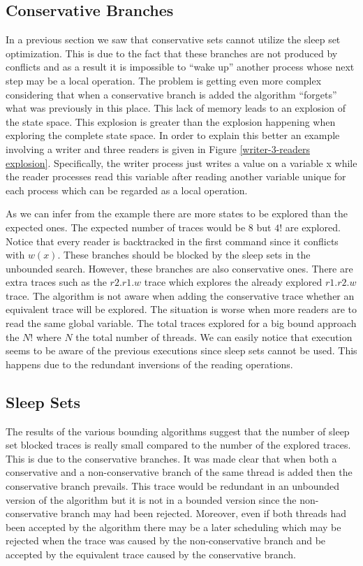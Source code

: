 \subsection{Conservative Branches}
In a previous section we saw that conservative sets cannot utilize the sleep set optimization. This is due
to the fact that these branches are not produced by conflicts and as a result it is impossible to ``wake up'' another
process whose next step may be a local operation. The problem is getting even more complex considering that when a
conservative branch is added the algorithm ``forgets'' what was previously in this place. This lack of memory leads to an
explosion of the state space. This explosion is greater than the explosion happening when exploring the complete state
space. In order to explain this better an example involving a writer and three readers is given in Figure \ref{writer-3-readers
explosion}. Specifically, the writer process just writes a value on a variable x while the reader processes read this variable
after reading another variable unique for each process which can be regarded as a local operation.


As we can infer from the example there are more states to be explored than the expected ones. The expected number of
traces would be $8$ but $4!$ are explored. Notice that every reader is backtracked in the first command since it
conflicts with $w(x)$. These branches should be blocked by the sleep sets in the unbounded search. However, these
branches are also conservative ones. There are extra traces such as the $r2.r1.w$ trace which explores the already
explored $r1.r2.w$ trace. The algorithm is not aware when adding the conservative trace whether an equivalent trace will
be explored. The situation is worse when more readers are to read the same global variable. The total traces explored
for a big bound approach the $N!$ where $N$ the total number of threads. We can easily notice that execution seems to be
aware of the previous executions since sleep sets cannot be used. This happens due to the redundant inversions of the
reading operations. 

\subsection{Sleep Sets}
The results of the various bounding algorithms suggest that the number of sleep set blocked traces is really small
compared to the number of the explored traces. This is due to the conservative branches. It was made clear that when
both a conservative and a non-conservative branch of the same thread is added then the conservative branch prevails.
This trace would be redundant in an unbounded version of the algorithm but it is not in a bounded version since the
non-conservative branch may had been rejected. Moreover, even if both threads had been accepted by the algorithm there
may be a later scheduling which may be rejected when the trace was caused by the non-conservative branch and be accepted
by the equivalent trace caused by the conservative branch. 

